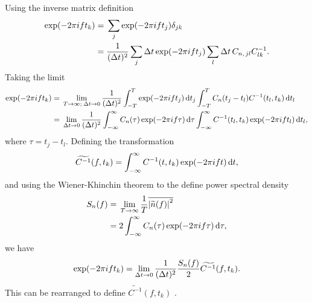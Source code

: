 Using the inverse matrix definition
\begin{align}
\exp(-2\pi i f t_k) = {} & \sum_j \exp(-2\pi ift_j) \delta_{jk} \nonumber \\
 = {} & \frac{1}{(\Delta t)^2} \sum_j \Delta t \exp(-2\pi ift_j) \sum_l \Delta t \, C_{n,\,jl}C^{-1}_{lk}.
\end{align}
Taking the limit
\begin{align}
\exp(-2\pi i f t_k) = {} & \lim_{T \rightarrow \infty; \; \Delta t \rightarrow 0} \frac{1}{(\Delta t)^2} \int_{-T}^{T}{\exp(-2\pi ift_j)}\,\mathrm{d}{t_j} \int_{-T}^{T}{C_n(t_j-t_l)C^{-1}(t_l,t_k)}\,\mathrm{d}{t_l} \nonumber \\
 = {} & \lim_{\Delta t \rightarrow 0} \frac{1}{(\Delta t)^2} \int_{-\infty}^{\infty}{C_n(\tau)\exp(-2\pi if\tau)}\,\mathrm{d}{\tau} \int_{-\infty}^{\infty}{C^{-1}(t_l,t_k)\exp(-2\pi if t_l)}\,\mathrm{d}{t_l},
\end{align}
where $\tau = t_j - t_l$. Defining the transformation
\begin{equation}
\widetilde{C^{-1}}(f,t_k) = \int_{-\infty}^{\infty}{C^{-1}(t,t_k)\exp(-2\pi if t)}\,\mathrm{d}{t},
\end{equation}
and using the Wiener-Khinchin theorem to the define power spectral density \citep{Cutler1994}
\begin{align}
\label{eq:PSD-WK}
S_n(f) = {} & \lim_{T \rightarrow \infty} \frac{1}{T} \overline{\left|\widetilde{n}(f)\right|^2} \\
 = {} & 2 \int_{-\infty}^{\infty}{C_n(\tau)\exp(-2\pi i f\tau)}\,\mathrm{d}{\tau},
\end{align}
we have
\begin{equation}
\exp(-2\pi i f t_k) = \lim_{\Delta t \rightarrow 0} \frac{1}{(\Delta t)^2} \frac{S_n(f)}{2} \widetilde{C^{-1}}(f,t_k).
\end{equation}
This can be rearranged to define $\widetilde{C^{-1}}(f,t_k)$ \citep{Finn1992}.

